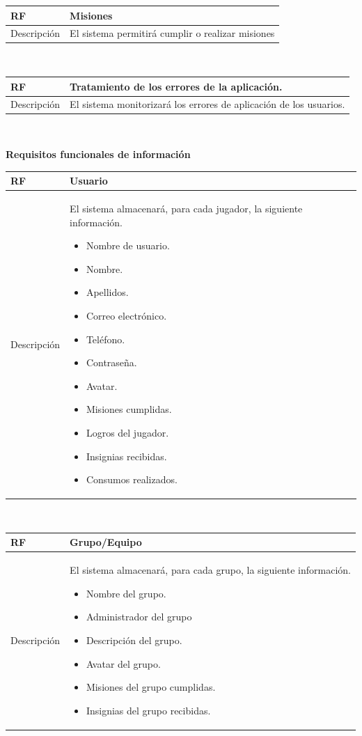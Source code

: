 \documentclass[twoside]{report}
\newcommand\addrow[2]{#1 &#2\\ }
\newcommand\addheading[2]{#1 &#2\\ \hline}
\newcommand\tabularhead{\begin{tabular}{lp{0.7\textwidth}}
\hline
}
\newenvironment{req}{\tabularhead}
{\hline\end{tabular}}
\begin{document}
\begin{req}
	\addheading{\textbf{RF\arabic{functionalRequirements}}}{Misiones}
	\addrow{Descripción}{El sistema permitirá cumplir o realizar misiones}
\end{req}\\

\begin{req}
	\addheading{\textbf{RF\arabic{functionalRequirements}}}{Tratamiento de los errores de la aplicación.}
	\addrow{Descripción}{El sistema monitorizará los errores de aplicación de los usuarios.}
\end{req}\\

\textbf{Requisitos funcionales de información}\\

\begin{req}
	\addheading{\textbf{RF\arabic{functionalRequirements}}}{Usuario}
	\addrow{Descripción}{
	El sistema almacenará, para cada jugador, la siguiente información.
	\begin{multicols}{2}
	\begin{itemize}
		\item Nombre de usuario.
		\item Nombre.
		\item Apellidos.
		\item Correo electrónico.
		\item Teléfono.
		\item Contraseña.
		\item Avatar.
		\item Misiones cumplidas.
		\item Logros del jugador.
		\item Insignias recibidas.
		\item Consumos realizados.
	\end{itemize}
	\end{multicols}
	}
\end{req}\\

\begin{req}
	\addheading{\textbf{RF\arabic{functionalRequirements}}}{Grupo/Equipo}
	\addrow{Descripción}{
	El sistema almacenará, para cada grupo, la siguiente información.
	\begin{multicols}{2}
	\begin{itemize}
		\item Nombre del grupo.
		\item Administrador del grupo
		\item Descripción del grupo.
		\item Avatar del grupo.
		\item Misiones del grupo cumplidas.
		\item Insignias del grupo recibidas.
	\end{itemize}
	\end{multicols}
	}
\end{req}\\
\end{document}
